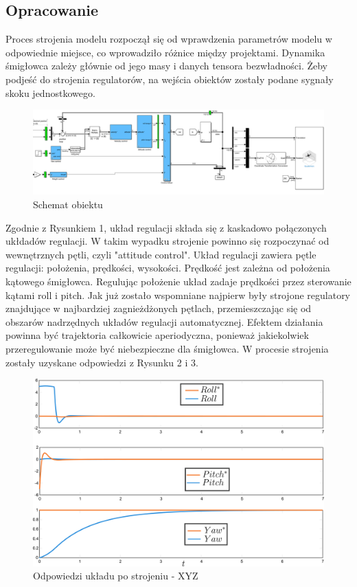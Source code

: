 \documentclass[polish,11pt,a4paper]{article}
\begin{document}
\subsection*{Opracowanie}
Proces strojenia modelu rozpoczął się od wprawdzenia parametrów modelu w odpowiednie miejsce, co 
wprowadziło różnice między projektami. Dynamika śmigłowca zależy głównie od jego masy i danych tensora 
bezwładności. Żeby podjeść do strojenia regulatorów, na wejścia obiektów zostały podane sygnały skoku
jednostkowego.
\begin{figure}[ht]
    \centering
    \includegraphics[width=1\linewidth]{strojenie/str-sch.png}
    \caption{Schemat obiektu}
    \label{fig:enter-label}
\end{figure}
Zgodnie z Rysunkiem 1, układ regulacji składa się z kaskadowo połączonych ukłdadów regulacji.
W takim wypadku strojenie powinno się rozpoczynać od wewnętrznych pętli, czyli "attitude control".
Układ regulacji zawiera pętle regulacji: położenia, prędkości, wysokości. Prędkość jest zależna od położenia
kątowego śmigłowca. Regulując położenie układ zadaje prędkości przez sterowanie kątami roll i pitch. Jak już 
zostało wspomniane najpierw były strojone regulatory znajdujące w najbardziej zagnieżdżonych pętlach, przemieszczając się 
od obszarów nadrzędnych układów regulacji automatycznej. Efektem działania powinna być trajektoria całkowicie aperiodyczna,
ponieważ jakiekolwiek przeregulowanie może być niebezpieczne dla śmigłowca. W procesie strojenia zostały uzyskane
odpowiedzi z Rysunku 2 i 3.
\begin{figure}[ht]
    \centering
    \includegraphics[width=0.7\linewidth]{strojenie/RLY.png}
    \caption{Odpowiedzi układu po strojeniu - XYZ}
    \label{fig:enter-label}
\end{figure}
\end{document}
